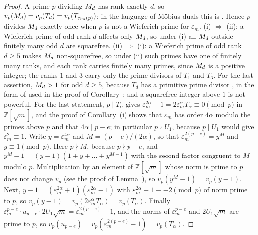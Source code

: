 \begin{proof}
A prime $p$ dividing $M_{d}$ has rank exactly $d$, so $v_p(M_{d}) = v_p(T_d) = v_p(T_{\alpha_m(p)})$; in the language of Möbius duals
this is \cite[Theorem~2.2(c)]{RossShenCai2026}. Hence $p$ divides $M_{d}$ exactly once when $p$ is not a Wieferich prime for
$\varepsilon_m$. (i) $\Rightarrow$ (ii): a Wieferich prime of odd rank $d$ affects only $M_{d}$, so under (i) all $M_{d}$ outside
finitely many odd $d$ are squarefree. (ii) $\Rightarrow$ (i): a Wieferich prime of odd rank $d \ge 5$ makes $M_{d}$ non-squarefree, so
under (ii) such primes have one of finitely many ranks, and each rank carries finitely many primes, since $M_{d}$ is a positive
integer; the ranks $1$ and $3$ carry only the prime divisors of $T_1$ and $T_3$. For the last assertion, $M_{d} > 1$ for odd $d \ge 5$,
because $T_d$ has a primitive prime divisor \cite{Carmichael1913}, in the form of \cite{Yabuta2001} used in the proof of
Corollary~; and a squarefree integer above $1$ is not powerful.
For the last statement, $p \mid T_\alpha$ gives $\varepsilon_m^{2\alpha} + 1 = 2\varepsilon_m^{\alpha} T_\alpha \equiv 0 \pmod p$ in $\mathbb{Z}[\sqrt{m}]$, and the proof of
Corollary~(i) shows that $\varepsilon_m$ has order $4\alpha$ modulo the primes above $p$ and that $4\alpha \mid p - e$; in particular $p \nmid U_1$, because
$p \mid U_1$ would give $\varepsilon_m^2 \equiv 1$. Write $y = \varepsilon_m^{4\alpha}$ and $M = (p - e)/(2\alpha)$, so that $\varepsilon_m^{2(p-e)} = y^M$ and
$y \equiv 1 \pmod p$. Here $p \nmid M$, because $p \nmid p - e$, and $y^M - 1 = (y - 1)(1 + y + \dots + y^{M-1})$ with the second factor congruent to $M$ modulo $p$.
Multiplication by an element of $\mathbb{Z}[\sqrt{m}]$ whose norm is prime to $p$ does not change $v_p$ (see the proof of Lemma~), so
$v_p(y^M - 1) = v_p(y - 1)$. Next, $y - 1 = (\varepsilon_m^{2\alpha} + 1)(\varepsilon_m^{2\alpha} - 1)$ with $\varepsilon_m^{2\alpha} - 1 \equiv -2 \pmod p$ of norm prime to $p$, so
$v_p(y - 1) = v_p(2\varepsilon_m^{\alpha} T_\alpha) = v_p(T_\alpha)$. Finally $\varepsilon_m^{p-e} \cdot u_{p-e} \cdot 2U_1\sqrt{m} = \varepsilon_m^{2(p-e)} - 1$, and the norms of
$\varepsilon_m^{p-e}$ and $2U_1\sqrt{m}$ are prime to $p$, so $v_p(u_{p-e}) = v_p(\varepsilon_m^{2(p-e)} - 1) = v_p(T_\alpha)$.
\end{proof}

